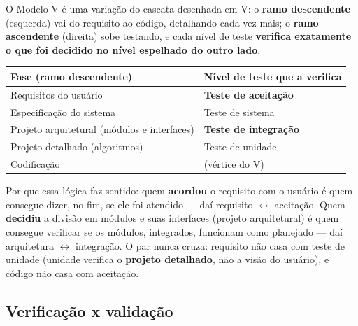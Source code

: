\begin{conceito}
O Modelo V é uma variação do cascata desenhada em V: o \textbf{ramo
descendente} (esquerda) vai do requisito ao código, detalhando cada vez
mais; o \textbf{ramo ascendente} (direita) sobe testando, e cada nível de
teste \textbf{verifica exatamente o que foi decidido no nível espelhado do
outro lado}.

\begin{center}
\begin{tabular}{@{}p{6cm}p{5.6cm}@{}}
\toprule
\textbf{Fase (ramo descendente)} & \textbf{Nível de teste que a verifica} \\
\midrule
Requisitos do usuário & \textbf{Teste de aceitação} \\
Especificação do sistema & Teste de sistema \\
Projeto arquitetural (módulos e interfaces) & \textbf{Teste de integração} \\
Projeto detalhado (algoritmos) & Teste de unidade \\
Codificação & (vértice do V) \\
\bottomrule
\end{tabular}
\end{center}

Por que essa lógica faz sentido: quem \textbf{acordou} o requisito com o
usuário é quem consegue dizer, no fim, se ele foi atendido --- daí requisito
$\leftrightarrow$ aceitação. Quem \textbf{decidiu} a divisão em módulos e
suas interfaces (projeto arquitetural) é quem consegue verificar se os
módulos, integrados, funcionam como planejado --- daí arquitetura
$\leftrightarrow$ integração. O par nunca cruza: requisito não casa com
teste de unidade (unidade verifica o \textbf{projeto detalhado}, não a
visão do usuário), e código não casa com aceitação.
\end{conceito}

\subsection{Verificação x validação}

